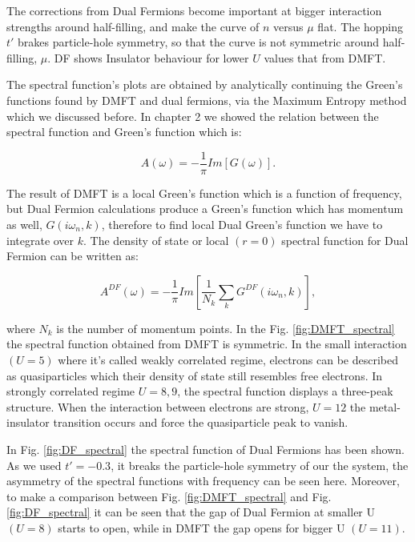 \noindent The corrections from Dual Fermions become important at bigger interaction strengths around half-filling, and make the curve of  $n$ versus $\mu$ flat. The hopping $t'$ brakes particle-hole symmetry, so that the curve is not symmetric around half-filling, $\mu$. DF shows Insulator behaviour for lower $U$ values that from DMFT. 


The spectral function's plots are obtained by analytically continuing the Green's functions found by DMFT and dual fermions, via the Maximum Entropy method \cite{M.Jarrell} which we discussed before. In chapter 2 we showed the relation between the spectral function and Green's function which is:

\begin{equation}
    A(\omega) = -\frac{1}{\pi}Im[G(\omega)].
\end{equation}

The result of DMFT is a local Green's function which is a function of frequency, but Dual Fermion calculations produce a Green's function which has momentum as well, $G(i\omega _n , k)$, therefore to find local Dual Green's function we have to integrate over $k$. The density of state or local $(r=0)$ spectral function for Dual Fermion can be written as:

\begin{equation}
    A^{DF} (\omega) = -\frac{1}{\pi} Im[\frac{1}{N_k}\sum _k G^{DF} (i\omega _n , k)],
\end{equation}

\noindent where $N_k$ is the number of momentum points.
In the Fig. \ref{fig:DMFT_spectral} the spectral function obtained from DMFT is symmetric. In the small interaction $(U=5)$ where it's called weakly correlated regime, electrons can be described as quasiparticles which their density of state still resembles free electrons. In strongly correlated regime $U= 8, 9$, the spectral function displays a three-peak structure. When the interaction between electrons are strong, $U=12$ the metal-insulator transition occurs and force the quasiparticle peak to vanish. 

In Fig. \ref{fig:DF_spectral} the spectral function of Dual Fermions has been shown. As we used $t'=-0.3$, it breaks the particle-hole symmetry of our the system, the asymmetry of the spectral functions with frequency can be seen here. Moreover, to make a comparison between Fig. \ref{fig:DMFT_spectral} and Fig. \ref{fig:DF_spectral} it can be seen that the gap of Dual Fermion at smaller U $(U=8)$ starts to open, while in DMFT the gap opens for bigger U $(U=11)$. 

